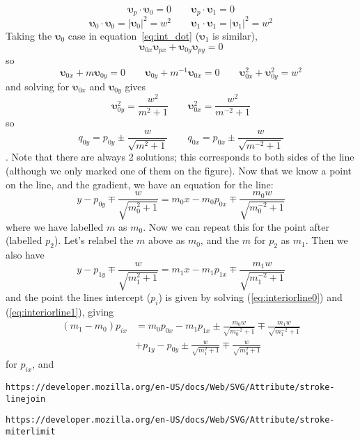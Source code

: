 \documentclass[]{article}
\newcommand{\bmups}{\bm{\upsilon}}
\begin{document}
\begin{equation}\label{eq:int_dot}
\bmups_p \cdot \bmups_0 = 0 \qquad \bmups_p \cdot \bmups_1 = 0
\end{equation}
\begin{equation}
\bmups_0 \cdot \bmups_0 = |\bmups_0|^2 = w^2 \qquad \bmups_1 \cdot \bmups_1 = |\bmups_1|^2 = w^2
\end{equation}
Taking the $\bmups_0$ case in equation~\ref{eq:int_dot} ($\bmups_1$ is similar),
\begin{equation*}
\bmups_{0x} \bmups_{px} + \bmups_{0y} \bmups_{py} = 0
\end{equation*}
so
\begin{equation}
\bmups_{0x} + m \bmups_{0y} = 0 \qquad \bmups_{0y} + m^{-1} \bmups_{0x} = 0 \qquad \bmups_{0x}^2 + \bmups_{0y}^2 = w^2
\end{equation}
and solving for $\bmups_{0x}$ and $\bmups_{0y}$ gives
\begin{equation}
\bmups_{0y}^2 = \frac{w^2}{m^2 + 1} \qquad \bmups_{0x}^2 = \frac{w^2}{m^{-2} + 1}
\end{equation}
so
\begin{equation}
q_{0y} = p_{0y} \pm \frac{w}{\sqrt{m^2 + 1}} \qquad q_{0x} = p_{0x} \pm \frac{w}{\sqrt{m^{-2} + 1}}
\end{equation}
. Note that there are always 2 solutions; this corresponds to both sides of the line (although we only marked one of them on the figure). Now that we know a point on the line, and the gradient, we have an equation for the line:
\begin{equation}\label{eq:interiorline0}
y - p_{0y} \mp \frac{w}{\sqrt{m_0^2+1}} = m_0x - m_0p_{0x} \mp \frac{m_0w}{\sqrt{m_0^{-2}+1}}
\end{equation}
where we have labelled $m$ as $m_0$. Now we can repeat this for the point after (labelled $p_2$). Let's relabel the $m$ above as $m_0$, and the $m$ for $p_2$ as $m_1$. Then we also have
\begin{equation}\label{eq:interiorline1}
y - p_{1y} \mp \frac{w}{\sqrt{m_1^2+1}} = m_1x - m_1p_{1x} \mp \frac{m_1w}{\sqrt{m_1^{-2}+1}}
\end{equation}
and the point the lines intercept ($p_i$) is given by solving (\ref{eq:interiorline0}) and (\ref{eq:interiorline1}), giving
\begin{align}
(m_1 - m_0)p_{ix} &= m_0p_{0x} - m_1p_{1x} \pm \frac{m_0w}{\sqrt{m_0^{-2}+1}} \mp \frac{m_1w}{\sqrt{m_1^{-2}+1}} \\ 
&+ p_{1y} - p_{0y} \pm \frac{w}{\sqrt{m^2_1 + 1}} \mp \frac{w}{\sqrt{m_0^2 + 1}}
\end{align}
for $p_{ix}$, and

\begin{thebibliography}{9}
	\texttt{https://developer.mozilla.org/en-US/docs/Web/SVG/Attribute/stroke-linejoin}
	
	\texttt{https://developer.mozilla.org/en-US/docs/Web/SVG/Attribute/stroke-miterlimit}
\end{thebibliography}
\end{document}
